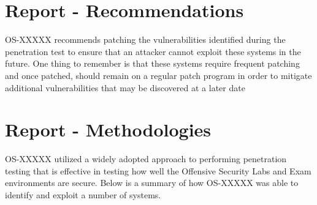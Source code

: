\documentclass[a4paper, 10pt, oneside]{article}
\begin{document}
\section{Report	- Recommendations}

OS-XXXXX recommends	patching	the	vulnerabilities	identified	during	the	penetration	test to	ensure	that	
an	attacker	 cannot	exploit	 these	 systems	 in	 the	 future.	One	 thing	 to	 remember	 is	 that	 these	 systems	
require	 frequent	 patching	 and	 once	 patched,	 should	 remain	 on	 a	 regular	 patch	 program	 in	 order	 to	
mitigate	additional	vulnerabilities	that may	be discovered	at	a	later	date

\section{Report	- Methodologies}
OS-XXXXX utilized a	 widely	 adopted	 approach	 to	 performing	 penetration	 testing	 that	 is	 effective	 in	
testing	how	well	the	Offensive	Security Labs	and	Exam	environments	are	secure.	Below	is	a	summary of	
how	OS-XXXXX	was	able	to	identify	and exploit	a	number	of	systems.




\newcommand{\hostname}{}
\newcommand{\ip}{}
\newcommand{\tcpports}{}
\newcommand{\udpports}{}
\newcommand{\os}{}
\newcommand{\vuln}{}
\newcommand{\product}{}
\newcommand{\vulnx}{}
\newcommand{\productx}{}



\end{document}
